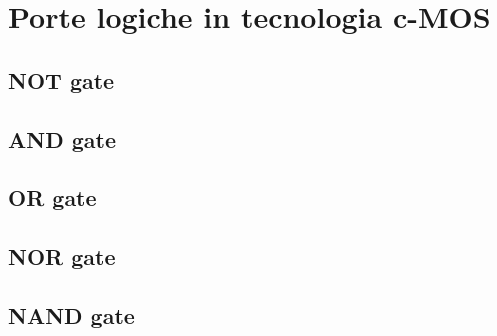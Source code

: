 \section{Porte logiche in tecnologia c-MOS}
\subsection{NOT gate}


\subsection{AND gate}


\subsection{OR gate}



\subsection{NOR gate}



\subsection{NAND gate}

